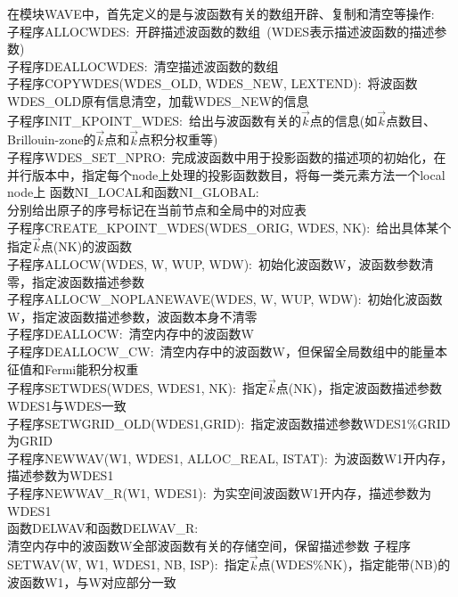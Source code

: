 在模块\textrm{WAVE}中，首先定义的是与波函数有关的数组开辟、复制和清空等操作:\\
子程序\textrm{ALLOCWDES}:~开辟描述波函数的数组~(\textrm{WDES}表示描述波函数的描述参数)\\
子程序\textrm{DEALLOCWDES}:~清空描述波函数的数组\\
子程序\textrm{COPYWDES(WDES\_OLD, WDES\_NEW, LEXTEND)}:~将波函数\textrm{WDES\_OLD}原有信息清空，加载\textrm{WDES\_NEW}的信息\\
子程序\textrm{INIT\_KPOINT\_WDES}:~给出与波函数有关的$\vec k$点的信息(如$\vec k$点数目、\textrm{Brillouin-zone}的$\vec k$点和$\vec k$点积分权重等)\\
子程序\textrm{WDES\_SET\_NPRO}:~完成波函数中用于投影函数的描述项的初始化，在并行版本中，指定每个\textrm{node}上处理的投影函数数目，将每一类元素方法一个\textrm{local node}上
函数\textrm{NI\_LOCAL}和函数\textrm{NI\_GLOBAL}:\\
分别给出原子的序号标记在当前节点和全局中的对应表\\
子程序\textrm{CREATE\_KPOINT\_WDES(WDES\_ORIG, WDES, NK)}:~给出具体某个指定$\vec k$点(\textrm{NK})的波函数\\
子程序\textrm{ALLOCW(WDES, W, WUP, WDW)}:~初始化波函数\textrm{W}，波函数参数清零，指定波函数描述参数\\
子程序\textrm{ALLOCW\_NOPLANEWAVE(WDES, W, WUP, WDW)}:~初始化波函数\textrm{W}，指定波函数描述参数，波函数本身不清零\\
子程序\textrm{DEALLOCW}:~清空内存中的波函数\textrm{W}\\
子程序\textrm{DEALLOCW\_CW}:~清空内存中的波函数\textrm{W}，但保留全局数组中的能量本征值和\textrm{Fermi}能积分权重\\
子程序\textrm{SETWDES(WDES, WDES1, NK)}:~指定$\vec k$点(\textrm{NK})，指定波函数描述参数\textrm{WDES1}与\textrm{WDES}一致\\
子程序\textrm{SETWGRID\_OLD(WDES1,GRID)}:~指定波函数描述参数\textrm{WDES1\%GRID}为\textrm{GRID}\\
子程序\textrm{NEWWAV(W1, WDES1, ALLOC\_REAL, ISTAT)}:~为波函数\textrm{W1}开内存，描述参数为\textrm{WDES1}\\
子程序\textrm{NEWWAV\_R(W1, WDES1)}:~为实空间波函数\textrm{W1}开内存，描述参数为\textrm{WDES1}\\
函数\textrm{DELWAV}和函数\textrm{DELWAV\_R}:\\
清空内存中的波函数\textrm{W}全部波函数有关的存储空间，保留描述参数
子程序\textrm{SETWAV(W, W1, WDES1, NB, ISP)}:~指定$\vec k$点(\textrm{WDES\%NK})，指定能带\textrm{(NB)}的波函数\textrm{W1}，与\textrm{W}对应部分一致\\

